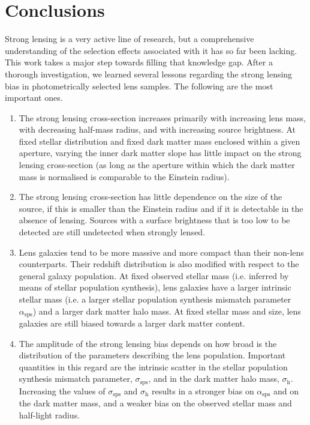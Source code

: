 \documentclass{aa}
\def\asps{\alpha_{\mathrm{sps}}}
\begin{document}

\section{Conclusions}\label{sect:concl}

Strong lensing is a very active line of research, but a comprehensive understanding of the selection effects associated with it has so far been lacking.
This work takes a major step towards filling that knowledge gap.
After a thorough investigation, we learned several lessons regarding the strong lensing bias in photometrically selected lens samples. The following are the most important ones.
\begin{enumerate}
\item The strong lensing cross-section increases primarily with increasing lens mass, with decreasing half-mass radius, and with increasing source brightness. 
At fixed stellar distribution and fixed dark matter mass enclosed within a given aperture, varying the inner dark matter slope has little impact on the strong lensing cross-section (as long as the aperture within which the dark matter mass is normalised is comparable to the Einstein radius).
\item The strong lensing cross-section has little dependence on the size of the source, if this is smaller than the Einstein radius and if it is detectable in the absence of lensing.
Sources with a surface brightness that is too low to be detected are still undetected when strongly lensed. 
\item Lens galaxies tend to be more massive and more compact than their non-lens counterparts. Their redshift distribution is also modified with respect to the general galaxy population.
At fixed observed stellar mass (i.e. inferred by means of stellar population synthesis), lens galaxies have a larger intrinsic stellar mass (i.e. a larger stellar population synthesis mismatch parameter $\asps$) and a larger dark matter halo mass.
At fixed stellar mass and size, lens galaxies are still biased towards a larger dark matter content.
\item The amplitude of the strong lensing bias depends on how broad is the distribution of the parameters describing the lens population. 
Important quantities in this regard are the intrinsic scatter in the stellar population synthesis mismatch parameter, $\sigma_{\mathrm{sps}}$, and in the dark matter halo mass, $\sigma_{\mathrm{h}}$.
Increasing the values of $\sigma_{\mathrm{sps}}$ and $\sigma_\mathrm{h}$ results in a stronger bias on $\asps$ and on the dark matter mass, and a weaker bias on the observed stellar mass and half-light radius.

\end{enumerate}
\end{document}
